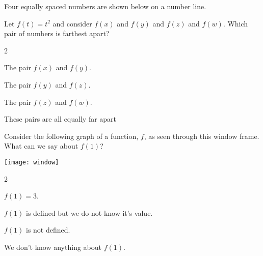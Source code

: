 \documentclass[12pt]{ximera}
\renewenvironment{multipleChoice}
{\begin{trivlist}\item[\hskip\labelsep\small\bfseries Choose the best answer:]
\hfil\begin{enumerate}\begin{multicols}{2}}
 {\end{multicols}\end{enumerate}\end{trivlist}}
\renewcommand{\choice}[2][]{\item \begin{minipage}[t]{2in}#2\end{minipage}\ifthenelse{\boolean{#1}}{\ifhandout \else  \fi}{}}
\begin{document}
\vspace{6ex}

\begin{minipage}{\textwidth}
\begin{problem}

  Four equally spaced numbers are shown below on a number line.
  \begin{image}
  \end{image}
  Let $f(t) = t^2$ and consider $f(x)$ and $f(y)$ and $f(z)$ and $f(w)$.  Which pair of numbers is farthest apart?
  \begin{multipleChoice}
    \choice{The pair $f(x)$ and $f(y)$.}
    \choice{The pair $f(y)$ and $f(z)$.}
    \choice[correct]{The pair $f(z)$ and $f(w)$.}
    \choice{These pairs are all equally far apart}
  \end{multipleChoice}
\end{problem}
\end{minipage}

\vspace{6ex}

\begin{minipage}{\textwidth}
\begin{problem}

  Consider the following graph of a function, $f$, as seen through this
  window frame.  What can we say about $f(1)$?
  \begin{image}
    \texttt{[image: window]}\\
  \end{image}
  \begin{multipleChoice}
    \choice{$f(1)=3$.}
    \choice{$f(1)$ is defined but we do not know it's value.}
    \choice{$f(1)$ is not defined.}
    \choice[correct]{We don't know anything about $f(1)$.}
  \end{multipleChoice}
\end{problem}
\end{minipage}
\end{document}
